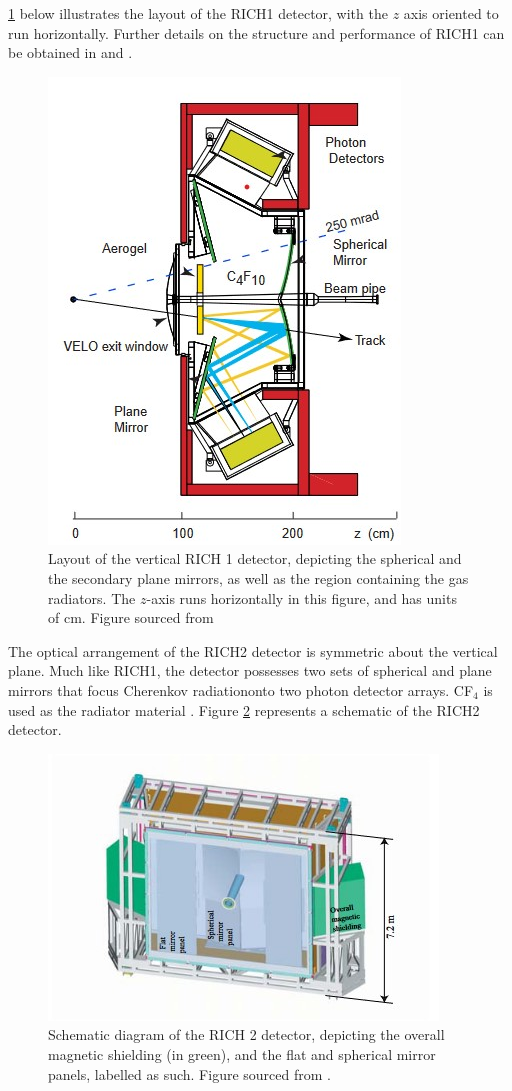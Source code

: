 \ref{RICH1Layout} below illustrates the layout of the RICH1 detector, with the $z$ axis oriented to run horizontally. 
Further details on the structure and performance of RICH1 can be obtained in \cite{Adinolfi_2013} and \cite{Antunes-Nobrega:630827}. 
\begin{figure}[H]
    \centering
    \includegraphics[scale=0.8]{RICH1Layout.jpg}
    \caption{Layout of the vertical RICH 1 detector, depicting the spherical and the secondary plane mirrors, as well as the region containing the gas radiators. The $z$-axis runs horizontally in this figure, and has units of cm. Figure sourced from \cite{Antunes-Nobrega:630827}}
    \label{RICH1Layout}
\end{figure}
The optical arrangement of the RICH2 detector is symmetric about the vertical plane. Much like RICH1, the detector possesses two sets of spherical and plane mirrors that focus Cherenkov radiationonto two photon detector arrays. CF$_{4}$ is used as the radiator material \cite{Harnew:2008zz}. Figure \ref{RICH2Layout} represents a schematic of the RICH2 detector.
\begin{figure}[H]
    \centering
    \includegraphics[scale = 1.2]{RICH2Layout.jpg}
    \caption{Schematic diagram of the RICH 2 detector, depicting the overall magnetic shielding (in green), and the flat and spherical mirror panels, labelled as such. Figure sourced from \cite{Harnew:2008zz}.}
    \label{RICH2Layout}
\end{figure}

